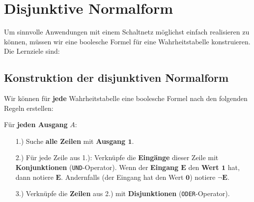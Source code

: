 
\toggletrue{image}
\toggletrue{imagehover}

\chapter{Disjunktive Normalform}
\label{ch:dnf}

Um sinnvolle Anwendungen mit einem Schaltnetz möglichst einfach realisieren zu können, müssen wir eine boolesche Formel für eine Wahrheitstabelle konstruieren. Die Lernziele sind:\\


\section{Konstruktion der disjunktiven Normalform}
\label{section-dnf}

Wir können für \textbf{jede} Wahrheitstabelle eine boolesche Formel nach den folgenden Regeln erstellen:

\begin{important}
Für \textbf{jeden Ausgang} $A$:
\begin{enumerate}
\item[1.)] Suche \textbf{alle Zeilen} mit \textbf{Ausgang $\mathbf{1}$}.
\item[2.)] Für jede Zeile aus 1.): Verknüpfe die \textbf{Eingänge} dieser Zeile mit \textbf{Konjunktionen} (\texttt{UND}-Operator). Wenn der \textbf{Eingang $\mathbf{E}$} den \textbf{Wert $\mathbf{1}$} hat, dann notiere $\mathbf{E}$. Andernfalls (der Eingang hat den Wert $\mathbf{0}$) notiere $\mathbf{\neg E}$.
\item[3.)] Verknüpfe die \textbf{Zeilen} aus 2.) mit \textbf{Disjunktionen} (\texttt{ODER}-Operator).
\end{enumerate}
\end{important}

